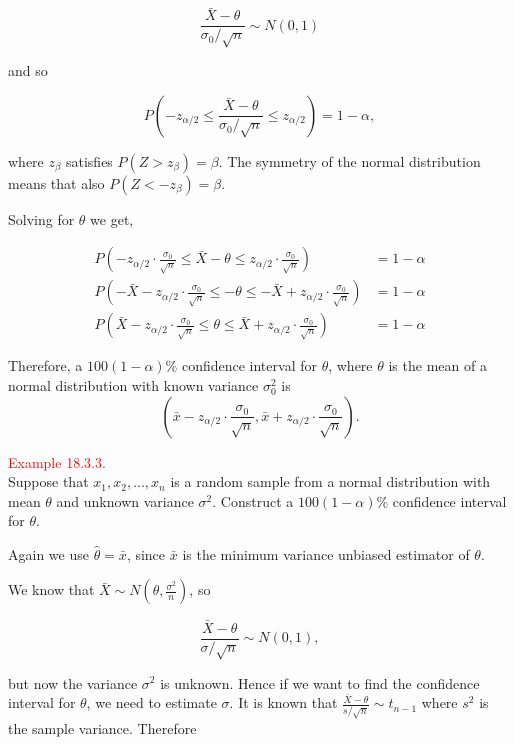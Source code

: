 \documentclass[
]{book}
\begin{document}
\[ \frac{\bar{X}-\theta}{\sigma_0/\sqrt{n}} \sim N \left( 0,1 \right)\]

and so

\[ P \left( -z_{\alpha/2} \leq \frac{\bar{X}-\theta}{\sigma_0/\sqrt{n}} \leq z_{\alpha/2} \right) =1-\alpha, \]

where \(z_\beta\) satisfies \(P (Z > z_\beta) = \beta\). The symmetry of the normal distribution means that also \(P(Z < - z_\beta) = \beta\).

Solving for \(\theta\) we get,

\begin{align*}
P \left( -z_{\alpha/2} \cdot \frac{\sigma_0}{\sqrt{n}} \leq \bar{X} - \theta \leq z_{\alpha/2} \cdot \frac{\sigma_0}{\sqrt{n}} \right) &= 1-\alpha \\[3pt]
P \left( -\bar{X} -z_{\alpha/2} \cdot \frac{\sigma_0}{\sqrt{n}} \leq -\theta \leq -\bar{X} +z_{\alpha/2} \cdot \frac{\sigma_0}{\sqrt{n}} \right) &= 1-\alpha \\[3pt]
P \left( \bar{X} -z_{\alpha/2} \cdot \frac{\sigma_0}{\sqrt{n}} \leq \theta \leq \bar{X} +z_{\alpha/2} \cdot \frac{\sigma_0}{\sqrt{n}} \right) &= 1-\alpha
\end{align*}

Therefore, a \(100(1-\alpha)\%\) confidence interval for \(\theta\), where \(\theta\) is the mean of a normal distribution with known variance \(\sigma_0^2\) is\\

\[ \left( \bar{x} -z_{\alpha/2} \cdot \frac{\sigma_0}{\sqrt{n}}, \bar{x} +z_{\alpha/2} \cdot \frac{\sigma_0}{\sqrt{n}} \right).\]

\hfill\break

\leavevmode{}%
\textcolor{red}{Example 18.3.3.}\\
Suppose that \(x_1,x_2,\dots,x_n\) is a random sample from a normal distribution with mean \(\theta\) and unknown variance \(\sigma^2\). Construct a \(100(1-\alpha)\%\) confidence interval for \(\theta\).

Again we use \(\hat{\theta} = \bar{x}\), since \(\bar{x}\) is the minimum variance unbiased estimator of \(\theta\).

We know that \(\bar{X} \sim N \left( \theta, \frac{\sigma^2}{n} \right)\), so

\[\frac{\bar{X}-\theta}{\sigma/\sqrt{n}} \sim N(0,1),\]

but now the variance \(\sigma^2\) is unknown. Hence if we want to find the confidence interval for \(\theta\), we need to estimate \(\sigma\). It is known that \(\frac{\bar{X}-\theta}{s/\sqrt{n}} \sim t_{n-1}\) where \(s^2\) is the sample variance. Therefore\\
\end{document}
